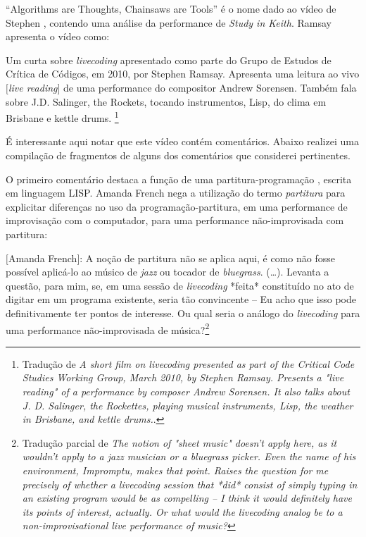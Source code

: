 ``Algorithms are Thoughts, Chainsaws are Tools'' é o nome dado ao vídeo de Stephen , contendo uma análise da performance de \emph{Study in Keith}. Ramsay apresenta o vídeo como:

\begin{citacao}
Um curta sobre \emph{livecoding} apresentado como parte do Grupo de Estudos de Crítica de Códigos, em 2010, por Stephen Ramsay. Apresenta uma leitura ao vivo $[$\emph{live reading}$]$ de uma performance do compositor Andrew Sorensen. Também fala sobre J.D. Salinger, the Rockets, tocando instrumentos, Lisp, do clima em Brisbane e kettle drums. \footnote{Tradução de \emph{A short film on livecoding presented as part of the Critical Code Studies Working Group, March 2010, by Stephen Ramsay. Presents a "live reading" of a performance by composer Andrew Sorensen. It also talks about J. D. Salinger, the Rockettes, playing musical instruments, Lisp, the weather in Brisbane, and kettle drums.}.}
\end{citacao}
É interessante aqui notar que este vídeo contém comentários. Abaixo realizei uma compilação de fragmentos de alguns dos comentários que considerei pertinentes. 

O primeiro comentário destaca a função de uma partitura-programação \cite[p.~5]{fenerich_marulho_2014}, escrita em linguagem LISP. Amanda French nega a utilização do termo \emph{partitura} para explicitar diferenças no uso da programação-partitura, em uma performance de improvisação com o computador, para uma performance não-improvisada com partitura:

\begin{citacao}
$[$Amanda French$]$: A noção de partitura não se aplica aqui, é como não fosse possível aplicá-lo ao músico de \emph{jazz} ou tocador de \emph{bluegrass}. (\ldots). Levanta a questão, para mim, se, em uma sessão de \emph{livecoding} *feita* constituído no ato de digitar em um programa existente, seria tão convincente -- Eu acho que isso pode definitivamente ter pontos de interesse. Ou qual seria o análogo do \emph{livecoding} para uma performance não-improvisada de música?\footnote{Tradução parcial de \emph{The notion of "sheet music" doesn't apply here, as it wouldn't apply to a jazz musician or a bluegrass picker. Even the name of his environment, Impromptu, makes that point. Raises the question for me precisely of whether a livecoding session that *did* consist of simply typing in an existing program would be as compelling -- I think it would definitely have its points of interest, actually. Or what would the livecoding analog be to a non-improvisational live performance of music?}}
\end{citacao}

